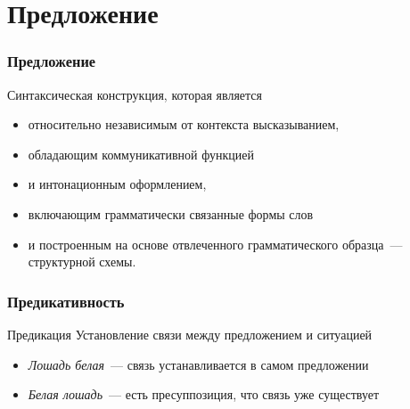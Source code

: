 \section{Предложение}
\frame{\tableofcontents[currentsection]}

\begin{frame}
  \frametitle{Предложение}

  Синтаксическая конструкция, которая является \begin{itemize}
    \item относительно независимым от контекста высказыванием,
    \item обладающим коммуникативной функцией
    \item и интонационным оформлением,
    \item включающим грамматически связанные формы слов
    \item и построенным на основе отвлеченного грамматического образца~--- структурной схемы.
  \end{itemize}
\end{frame}

\begin{frame}
  \frametitle{Предикативность}

  \begin{block}{Предикация}
    Установление связи между предложением и ситуацией
  \end{block}

  \vfill

  \begin{itemize}
    \item \textit{Лошадь белая}~--- связь устанавливается в самом предложении
    \item \textit{Белая лошадь}~--- есть пресуппозиция, что связь уже существует
  \end{itemize}
\end{frame}
